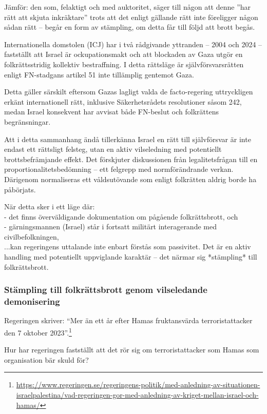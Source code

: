 Jämför: den som, felaktigt och med auktoritet, säger till någon att denne ”har rätt att skjuta inkräktare” trots 
att det enligt gällande rätt inte föreligger någon sådan rätt – begår en form av stämpling, 
om detta får till följd att brott begås.

Internationella domstolen (ICJ) har i två rådgivande yttranden – 2004 och 2024 – fastställt att Israel är ockupationsmakt 
och att blockaden av Gaza utgör en folkrättsstridig kollektiv bestraffning. I detta rättsläge är 
självförsvarsrätten enligt FN-stadgans artikel 51 inte tillämplig gentemot Gaza. 

Detta gäller särskilt eftersom Gazas lagligt valda de facto-regering uttryckligen erkänt internationell rätt, inklusive 
Säkerhetsrådets resolutioner såsom 242, medan Israel konsekvent har avvisat både FN-beslut och folkrättens begränsningar.

Att i detta sammanhang ändå tillerkänna Israel en rätt till självförsvar är inte endast ett rättsligt felsteg, 
utan en aktiv vilseledning med potentiellt brottsbefrämjande effekt. Det förskjuter diskussionen från legalitetsfrågan till en proportionalitetsbedömning – ett felgrepp med normförändrande verkan.
Därigenom normaliseras ett våldsutövande som enligt folkrätten aldrig borde ha påbörjats.

När detta sker i ett läge där:\\
- det finns överväldigande dokumentation om pågående folkrättsbrott, och\\
- gärningsmannen (Israel) står i fortsatt militärt interagerande med civilbefolkningen,\\

...kan regeringens uttalande inte enbart förstås som passivitet. 
Det är en aktiv handling med potentiellt uppviglande karaktär – det närmar sig *stämpling* till folkrättsbrott.

\subsubsection{Stämpling till folkrättsbrott genom vilseledande demonisering}

Regeringen skriver: \enquote{Mer än ett år efter Hamas fruktansvärda terroristattacker den 7 oktober 2023}.\footnote{\url{https://www.regeringen.se/regeringens-politik/med-anledning-av-situationen-israelpalestina/vad-regeringen-gor-med-anledning-av-kriget-mellan-israel-och-hamas/}}

Hur har regeringen fastställt att det rör sig om terroristattacker som Hamas som organisation bär skuld för?

